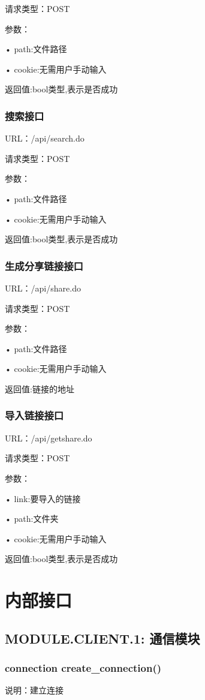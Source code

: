 请求类型：POST

参数： 

• path:文件路径

• cookie:无需用户手动输入

返回值:bool类型,表示是否成功

\subsubsection{搜索接口}
URL：/api/search.do

请求类型：POST

参数： 

• path:文件路径

• cookie:无需用户手动输入

返回值:bool类型,表示是否成功

\subsubsection{生成分享链接接口}
URL：/api/share.do

请求类型：POST

参数： 

• path:文件路径

• cookie:无需用户手动输入

返回值:链接的地址

\subsubsection{导入链接接口}
URL：/api/getshare.do

请求类型：POST

参数： 

• link:要导入的链接

• path:文件夹

• cookie:无需用户手动输入

返回值:bool类型,表示是否成功


\section{内部接口}

\subsection{MODULE.CLIENT.1: 通信模块}
\subsubsection{connection create_connection()}
说明：建立连接


